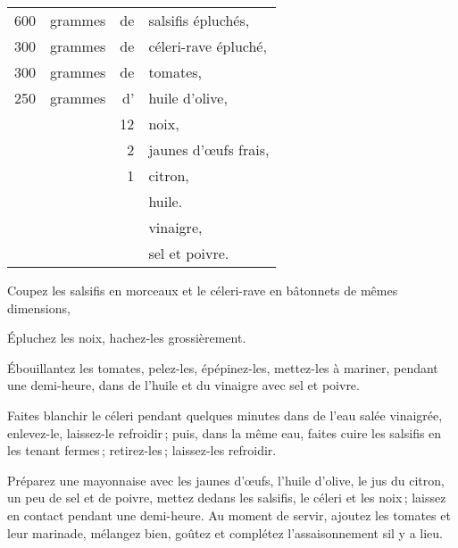 \footnotesize
\begin{longtable}{rrrp{16em}}
    600 & grammes & de & salsifis épluchés,                                                               \\
    300 & grammes & de & céleri-rave épluché,                                                             \\
    300 & grammes & de & tomates,                                                                         \\
    250 & grammes & d' & huile d'olive,                                                                   \\
        &         & 12 & noix,                                                                            \\
        &         &  2 & jaunes d'œufs frais,                                                             \\
        &         &  1 & citron,                                                                          \\
        &         &    & huile.                                                                           \\
        &         &    & vinaigre,                                                                        \\
        &         &    & sel et poivre.                                                                   \\
\end{longtable}
\normalsize

Coupez les salsifis en morceaux et le céleri-rave en bâtonnets de mêmes
dimensions,

Épluchez les noix, hachez-les grossièrement.

Ébouillantez les tomates, pelez-les, épépinez-les, mettez-les à mariner, pendant
une demi-heure, dans de l'huile et du vinaigre avec sel et poivre.

Faites blanchir le céleri pendant quelques minutes dans de l'eau salée
vinaigrée, enlevez-le, laissez-le refroidir ; puis, dans la même eau, faites
cuire les salsifis en les tenant fermes ; retirez-les ; laissez-les refroidir.

Préparez une mayonnaise avec les jaunes d'œufs, l'huile d'olive, le jus du
citron, un peu de sel et de poivre, mettez dedans les salsifis, le céleri et
les noix ; laissez en contact pendant une demi-heure. Au moment de servir,
ajoutez les tomates et leur marinade, mélangez bien, goûtez et complétez
l'assaisonnement sil y a lieu.

